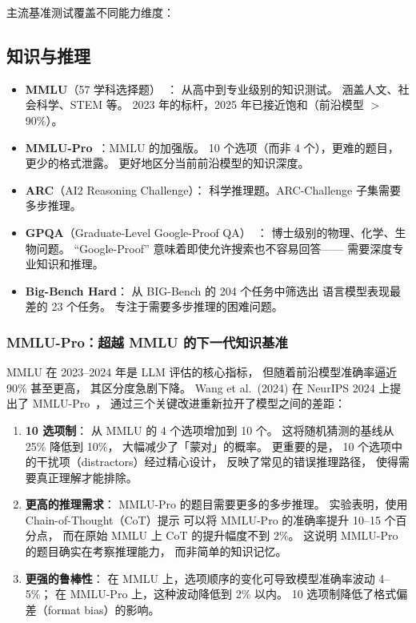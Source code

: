 主流基准测试覆盖不同能力维度：

\subsection{知识与推理}
\begin{itemize}[noitemsep]
  \item \textbf{MMLU}（57 学科选择题）~\cite{hendrycks2021mmlu}：
        从高中到专业级别的知识测试。
        涵盖人文、社会科学、STEM 等。
        2023 年的标杆，2025 年已接近饱和（前沿模型 $>$90\%）。
  \item \textbf{MMLU-Pro}~\cite{wang2024mmlupro}：MMLU 的加强版。
        10 个选项（而非 4 个），更难的题目，更少的格式泄露。
        更好地区分当前前沿模型的知识深度。
  \item \textbf{ARC}（AI2 Reasoning Challenge）：
        科学推理题。ARC-Challenge 子集需要多步推理。
  \item \textbf{GPQA}（Graduate-Level Google-Proof QA）~\cite{rein2024gpqa}：
        博士级别的物理、化学、生物问题。
        ``Google-Proof'' 意味着即使允许搜索也不容易回答——
        需要深度专业知识和推理。
  \item \textbf{Big-Bench Hard}：
        从 BIG-Bench 的 204 个任务中筛选出
        语言模型表现最差的 23 个任务。
        专注于需要多步推理的困难问题。
\end{itemize}

\subsubsection{MMLU-Pro：超越 MMLU 的下一代知识基准}

MMLU 在 2023--2024 年是 LLM 评估的核心指标，
但随着前沿模型准确率逼近 90\% 甚至更高，
其区分度急剧下降。
Wang et al.\ (2024) 在 NeurIPS 2024 上提出了 MMLU-Pro~\cite{wang2024mmlupro}，
通过三个关键改进重新拉开了模型之间的差距：

\begin{enumerate}[noitemsep]
  \item \textbf{10 选项制}：
        从 MMLU 的 4 个选项增加到 10 个。
        这将随机猜测的基线从 25\% 降低到 10\%，
        大幅减少了「蒙对」的概率。
        更重要的是，
        10 个选项中的干扰项（distractors）经过精心设计，
        反映了常见的错误推理路径，
        使得需要真正理解才能排除。
  \item \textbf{更高的推理需求}：
        MMLU-Pro 的题目需要更多的多步推理。
        实验表明，使用 Chain-of-Thought（CoT）提示
        可以将 MMLU-Pro 的准确率提升 10--15 个百分点，
        而在原始 MMLU 上 CoT 的提升幅度不到 2\%。
        这说明 MMLU-Pro 的题目确实在考察推理能力，
        而非简单的知识记忆。
  \item \textbf{更强的鲁棒性}：
        在 MMLU 上，选项顺序的变化可导致模型准确率波动 4--5\%；
        在 MMLU-Pro 上，这种波动降低到 2\% 以内。
        10 选项制降低了格式偏差（format bias）的影响。
\end{enumerate}


